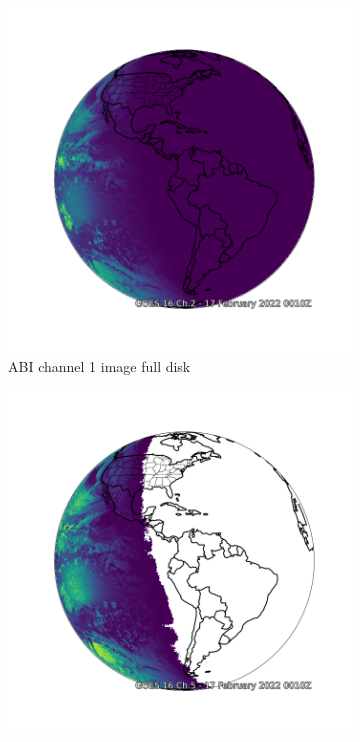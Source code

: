 \begin{figure}[h!]
  \centering
  \begin{subfigure}[a]{0.8\linewidth}
    \includegraphics[width=\linewidth]{goes_fulldisk_C01.png}
     \caption{ABI channel 1 image full disk}
  \end{subfigure}
  \begin{subfigure}[b]{0.4\linewidth}
    \includegraphics[width=\linewidth]{goes_fulldisk_C05.png}

\end{subfigure}
\end{figure}

